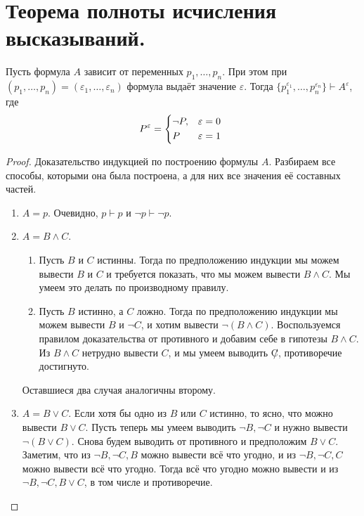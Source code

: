\documentclass{article}
\begin{document}
\section{Теорема полноты исчисления высказываний.}
\begin{lemma}
	Пусть формула \(A\) зависит от переменных \(p_1, \ldots, p_n\). При этом при \((p_1, \ldots, p_n) = (\varepsilon_1, \ldots, \varepsilon_n)\) формула выдаёт значение \(\varepsilon\). Тогда \(\{p_1^{\varepsilon_1}, \ldots, p_n^{\varepsilon_n}\} \vdash A^{\varepsilon}\), где
\[P^\varepsilon = \begin{dcases*} \lnot P, & \(\varepsilon = 0\) \\ P& \(\varepsilon = 1\) \end{dcases*} \]
\end{lemma}

\begin{proof}
	Доказательство индукцией по построению формулы \(A\). Разбираем все способы, которыми она была построена, а для них все значения её составных частей.
	\begin{enumerate}
		\item \(A = p\). Очевидно, \(p \vdash p\) и \(\lnot p \vdash \lnot p\).
		\item \(A = B \land C\).
		\begin{enumerate}
			\item Пусть \(B\) и \(C\) истинны. Тогда по предположению индукции мы можем вывести \(B\) и \(C\) и требуется показать, что мы можем вывести \(B \land C\). Мы умеем это делать по производному правилу.
			\item Пусть \(B\) истинно, а \(C\) ложно. Тогда по предположению индукции мы можем вывести \(B\) и \(\lnot C\), и хотим вывести \(\lnot(B \land C)\). Воспользуемся правилом доказательства от противного и добавим себе в гипотезы \(B \land C\). Из \(B \land C\) нетрудно вывести \(C\), и мы умеем выводить \(\not C\), противоречие достигнуто.
		\end{enumerate}
		Оставшиеся два случая аналогичны второму.
		\item \(A = B \lor C\). Если хотя бы одно из \(B\) или \(C\) истинно, то ясно, что можно вывести \(B \lor C\). Пусть теперь мы умеем выводить \(\lnot B, \lnot C\) и нужно вывести \(\lnot (B \lor C)\). Снова будем выводить от противного и предположим \(B \lor C\). Заметим, что из \(\lnot B, \lnot C, B\) можно вывести всё что угодно, и из \(\lnot B, \lnot C, C\) можно вывести всё что угодно. Тогда всё что угодно можно вывести и из \(\lnot B, \lnot C, B \lor C\), в том числе и противоречие.

\end{enumerate}
\end{proof}
\end{document}
